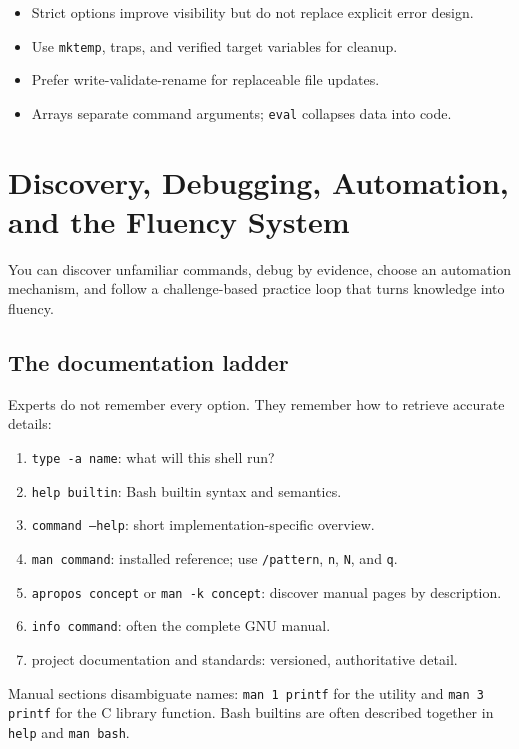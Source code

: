 \documentclass[11pt,oneside,openany]{book}
\newcommand{\chaptergoals}[1]{%
  \begin{tcolorbox}[colback=Paper,colframe=Blue,title={Learning outcomes},fonttitle=\bfseries]
  #1
  \end{tcolorbox}}
\begin{document}
\begin{recapbox}
\begin{itemize}
  \item Strict options improve visibility but do not replace explicit error design.
  \item Use \texttt{mktemp}, traps, and verified target variables for cleanup.
  \item Prefer write-validate-rename for replaceable file updates.
  \item Arrays separate command arguments; \texttt{eval} collapses data into code.
\end{itemize}
\end{recapbox}

\chapter{Discovery, Debugging, Automation, and the Fluency System}
\chaptergoals{You can discover unfamiliar commands, debug by evidence, choose an automation mechanism, and follow a challenge-based practice loop that turns knowledge into fluency.}

\section{The documentation ladder}
Experts do not remember every option. They remember how to retrieve accurate details:
\begin{enumerate}
  \item \texttt{type -a name}: what will this shell run?
  \item \texttt{help builtin}: Bash builtin syntax and semantics.
  \item \texttt{command --help}: short implementation-specific overview.
  \item \texttt{man command}: installed reference; use \texttt{/pattern}, \texttt{n}, \texttt{N}, and \texttt{q}.
  \item \texttt{apropos concept} or \texttt{man -k concept}: discover manual pages by description.
  \item \texttt{info command}: often the complete GNU manual.
  \item project documentation and standards: versioned, authoritative detail.
\end{enumerate}
Manual sections disambiguate names: \texttt{man 1 printf} for the utility and \texttt{man 3 printf} for the C library function. Bash builtins are often described together in \texttt{help} and \texttt{man bash}.
\end{document}
